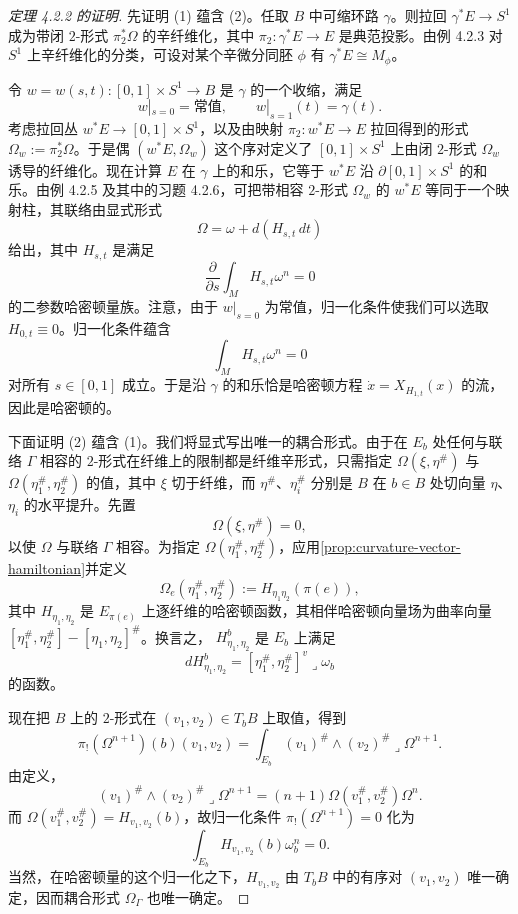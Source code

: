\begin{proof}[定理 4.2.2 的证明]
先证明 (1) 蕴含 (2)。任取 $B$ 中可缩环路 $\gamma$。则拉回
$\gamma^*E\to S^1$ 成为带闭 $2$-形式 $\pi_2^*\Omega$ 的辛纤维化，其中
$\pi_2:\gamma^*E\to E$ 是典范投影。由例 4.2.3 对 $S^1$ 上辛纤维化的分类，可设对某个辛微分同胚 $\phi$ 有
$\gamma^*E\cong M_\phi$。

令 $w=w(s,t):[0,1]\times S^1\to B$ 是 $\gamma$ 的一个收缩，满足
\[
 w|_{s=0}=\text{常值},
 \qquad w|_{s=1}(t)=\gamma(t).
\]
考虑拉回丛 $w^*E\to[0,1]\times S^1$，以及由映射
$\pi_2:w^*E\to E$ 拉回得到的形式 $\Omega_w:=\pi_2^*\Omega$。于是偶
$(w^*E,\Omega_w)$ 这个序对定义了 $[0,1]\times S^1$ 上由闭 $2$-形式
$\Omega_w$ 诱导的纤维化。现在计算 $E$ 在 $\gamma$ 上的和乐，它等于
$w^*E$ 沿 $\partial[0,1]\times S^1$ 的和乐。由例 4.2.5 及其中的习题 4.2.6，可把带相容 $2$-形式 $\Omega_w$ 的 $w^*E$ 等同于一个映射柱，其联络由显式形式
\[
 \Omega=\omega+d(H_{s,t}\,dt)
\]
给出，其中 $H_{s,t}$ 是满足
\[
 \frac{\partial}{\partial s}\int_M H_{s,t}\omega^n=0
\]
的二参数哈密顿量族。注意，由于 $w|_{s=0}$ 为常值，归一化条件使我们可以选取 $H_{0,t}\equiv0$。归一化条件蕴含
\[
 \int_M H_{s,t}\omega^n=0
\]
对所有 $s\in[0,1]$ 成立。于是沿 $\gamma$ 的和乐恰是哈密顿方程
$\dot x=X_{H_{1,t}}(x)$ 的流，因此是哈密顿的。

下面证明 (2) 蕴含 (1)。我们将显式写出唯一的耦合形式。由于在
$E_b$ 处任何与联络 $\Gamma$ 相容的 $2$-形式在纤维上的限制都是纤维辛形式，只需指定
$\Omega(\xi,\eta^\#)$ 与 $\Omega(\eta_1^\#,\eta_2^\#)$ 的值，其中
$\xi$ 切于纤维，而 $\eta^\#$、$\eta_i^\#$ 分别是 $B$ 在 $b\in B$ 处切向量
$\eta$、$\eta_i$ 的水平提升。先置
\[
 \Omega(\xi,\eta^\#)=0,
\]
以使 $\Omega$ 与联络 $\Gamma$ 相容。为指定
$\Omega(\eta_1^\#,\eta_2^\#)$，应用\cref{prop:curvature-vector-hamiltonian}并定义
\begin{equation}
 \Omega_e(\eta_1^\#,\eta_2^\#)
 :=H_{\eta_1\eta_2}(\pi(e)),
 \label{eq:coupling-form-horizontal-values}
\end{equation}
其中 $H_{\eta_1,\eta_2}$ 是 $E_{\pi(e)}$ 上逐纤维的哈密顿函数，其相伴哈密顿向量场为曲率向量
$[\eta_1^\#,\eta_2^\#]-[\eta_1,\eta_2]^\#$。换言之，
$H_{\eta_1,\eta_2}^b$ 是 $E_b$ 上满足
\begin{equation}
 dH_{\eta_1,\eta_2}^b
 =[\eta_1^\#,\eta_2^\#]^v\mathbin\lrcorner\omega_b
 \label{eq:curvature-hamiltonian}
\end{equation}
的函数。

现在把 $B$ 上的 $2$-形式在 $(v_1,v_2)\in T_bB$ 上取值，得到
\[
 \pi_!(\Omega^{n+1})(b)(v_1,v_2)
 =\int_{E_b}(v_1)^\#\wedge(v_2)^\#\mathbin\lrcorner\Omega^{n+1}.
\]
由定义，
\[
 (v_1)^\#\wedge(v_2)^\#\mathbin\lrcorner\Omega^{n+1}
 =(n+1)\Omega(v_1^\#,v_2^\#)\Omega^n.
\]
而 $\Omega(v_1^\#,v_2^\#)=H_{v_1,v_2}(b)$，故归一化条件
$\pi_!(\Omega^{n+1})=0$ 化为
\[
 \int_{E_b}H_{v_1,v_2}(b)\omega_b^n=0.
\]
当然，在哈密顿量的这个归一化之下，$H_{v_1,v_2}$ 由
$T_bB$ 中的有序对 $(v_1,v_2)$ 唯一确定，因而耦合形式 $\Omega_\Gamma$ 也唯一确定。


\end{proof}
